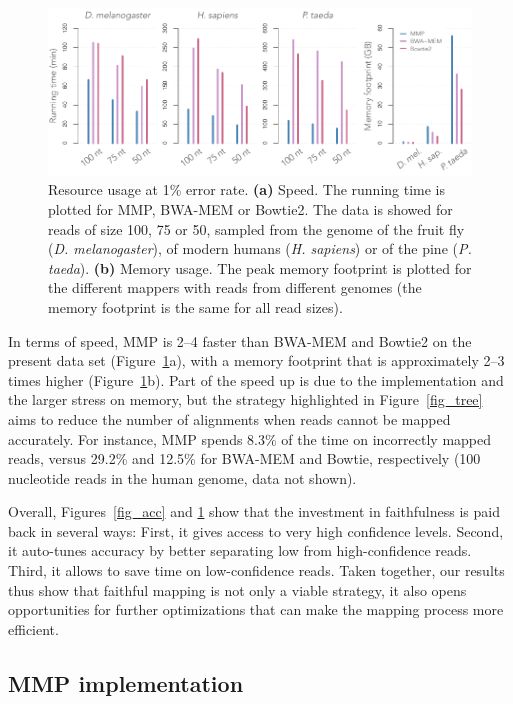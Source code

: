 \documentclass[a4,center,fleqn]{NAR}
\begin{document}
\begin{figure}[t]
\begin{center}
\includegraphics[scale=.58]{fig_timem.pdf}
\end{center}
\caption{Resource usage at 1\% error rate. \textbf{(a)} Speed. The running
time is plotted for MMP, BWA-MEM or Bowtie2. The data is showed for reads
of size 100, 75 or 50, sampled from the genome of the fruit fly
(\textit{D. melanogaster}), of modern humans (\textit{H. sapiens}) or of
the pine (\textit{P. taeda}). \textbf{(b)} Memory usage. The peak memory
footprint is plotted for the different mappers with reads from different
genomes (the memory footprint is the same for all read sizes).}
\label{fig_timem}
\end{figure}

In terms of speed, MMP is 2--4 faster than BWA-MEM and Bowtie2 on the
present data set (Figure~\ref{fig_timem}a), with a memory footprint that
is approximately 2--3 times higher (Figure~\ref{fig_timem}b). Part of the
speed up is due to the implementation and the larger stress on memory, but
the strategy highlighted in Figure~\ref{fig_tree} aims to reduce the
number of alignments when reads cannot be mapped accurately. For instance,
MMP spends 8.3\% of the time on incorrectly mapped reads, versus 29.2\%
and 12.5\% for BWA-MEM and Bowtie, respectively (100 nucleotide reads in
the human genome, data not shown).

Overall, Figures~\ref{fig_acc} and \ref{fig_timem} show that the
investment in faithfulness is paid back in several ways: First, it gives
access to very high confidence levels. Second, it auto-tunes accuracy by
better separating low from high-confidence reads. Third, it allows to save
time on low-confidence reads. Taken together, our results thus show that
faithful mapping is not only a viable strategy, it also opens
opportunities for further optimizations that can make the mapping process
more efficient.

\subsection{MMP implementation}
\end{document}
